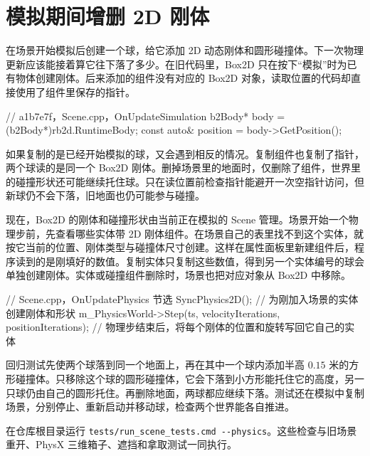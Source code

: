 \clearpage
\section{模拟期间增删 2D 刚体}

在场景开始模拟后创建一个球，给它添加 2D 动态刚体和圆形碰撞体。下一次物理更新应该能接着算它往下落了多少。在旧代码里，Box2D 只在按下“模拟”时为已有物体创建刚体。后来添加的组件没有对应的 Box2D 对象，读取位置的代码却直接使用了组件里保存的指针。

\begin{Code}
// a1b7e7f，Scene.cpp，OnUpdateSimulation
b2Body* body = (b2Body*)rb2d.RuntimeBody;
const auto& position = body->GetPosition();
\end{Code}

如果复制的是已经开始模拟的球，又会遇到相反的情况。复制组件也复制了指针，两个球读的是同一个 Box2D 刚体。删掉场景里的地面时，仅删除了组件，世界里的碰撞形状还可能继续托住球。只在读位置前检查指针能避开一次空指针访问，但新球仍不会下落，旧地面也仍可能参与碰撞。

现在，Box2D 的刚体和碰撞形状由当前正在模拟的 Scene 管理。场景开始一个物理步前，先查看哪些实体带 2D 刚体组件。在场景自己的表里找不到这个实体，就按它当前的位置、刚体类型与碰撞体尺寸创建。这样在属性面板里新建组件后，程序读到的是刚填好的数值。复制实体只复制这些数值，得到另一个实体编号的球会单独创建刚体。实体或碰撞组件删除时，场景也把对应对象从 Box2D 中移除。

\begin{Code}
// Scene.cpp，OnUpdatePhysics 节选
SyncPhysics2D();   // 为刚加入场景的实体创建刚体和形状
m_PhysicsWorld->Step(ts, velocityIterations, positionIterations);
// 物理步结束后，将每个刚体的位置和旋转写回它自己的实体
\end{Code}

回归测试先使两个球落到同一个地面上，再在其中一个球内添加半高 $0.15$ 米的方形碰撞体。只移除这个球的圆形碰撞体，它会下落到小方形能托住它的高度，另一只球仍由自己的圆形托住。再删除地面，两球都应继续下落。测试还在模拟中复制场景，分别停止、重新启动并移动球，检查两个世界能各自推进。

在仓库根目录运行 \texttt{tests/run\_scene\_tests.cmd\ \mbox{-{}-physics}}。这些检查与旧场景重开、PhysX 三维箱子、遮挡和拿取测试一同执行。
